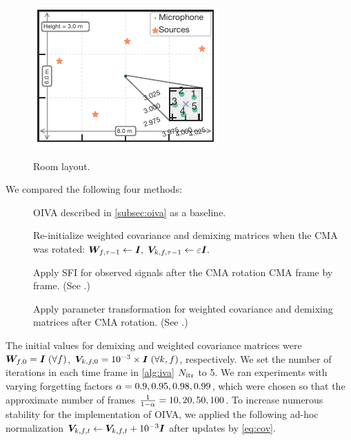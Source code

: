\documentclass[sip,biber]{now-journal}
\begin{document}
\begin{figure}[t]
\begin{minipage}[t]{.32\linewidth}
    \centering
    \includegraphics[width=\columnwidth]{figures/room_layout_040.pdf}
    \label{fig:layout:rot}
  \end{minipage}
  \caption{Room layout.}%
  \label{fig:layout:exp}
\end{figure}

We compared the following four methods:
\begin{description}
  \item[\NaiveIVA] OIVA described in \cref{subsec:oiva} as a baseline.
  \item[\ResetIVA] Re-initialize weighted covariance and demixing matrices when the CMA was rotated:
      $\bm{W} _{f,\tau - 1} \gets \bm{I}, \; \bm{V} _{k,f,\tau - 1} \gets \varepsilon \bm{I}.$
  \item[\SFIIVAo] Apply SFI for observed signals after the CMA rotation CMA frame by frame. (See .)
  \item[\SFIIVAm] Apply parameter transformation for weighted covariance and demixing matrices after CMA rotation.  (See .)
\end{description}
The initial values for demixing and weighted covariance matrices were
$\bm{W} _{f,0} = \bm{I}\; (\forall f)$, $\bm{V} _{k,f,0} = 10^{-3}\times\bm{I}\; (\forall k, f)$, respectively.
We set the number of iterations in each time frame in \cref{alg:iva} $N _{\mathrm{itr}}$ to 5.
We ran experiments with varying forgetting factors $\alpha = 0.9, 0.95, 0.98, 0.99$, which were chosen so that the approximate number of frames $\frac{1}{1 - \alpha} = 10, 20, 50, 100$.
To increase numerous stability for the implementation of OIVA,
we applied the following ad-hoc normalization $\cov _{\src,\ft} \gets \cov _{\src,\ft} + 10 ^{-3} \Eye$ after updates by \eqref{eq:cov}.
\end{document}
